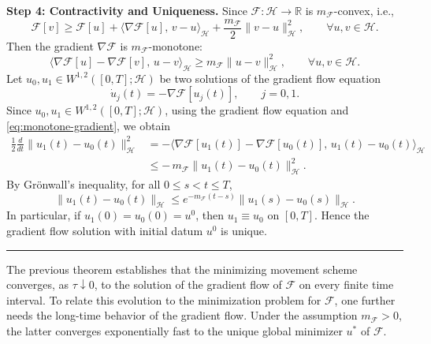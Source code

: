 \documentclass[twoside,11pt]{article}
\newcommand{\BlackBoxProof}{\rule{1.5ex}{1.5ex}}
\renewenvironment{proof}{\par\noindent{\bf Proof\ }}{\hfill\BlackBoxProof\par\medskip}
\newcommand{\calF}{\mathcal{F}}
\begin{document}
\begin{proof}
\noindent \textbf{Step 4: Contractivity and Uniqueness.} Since $\mathcal F:\mathcal H\to\mathbb R$ is $m_{\mathcal F}$-convex, i.e.,
\[
\mathcal F[v]\ge \mathcal F[u]
+\langle \nabla\mathcal F[u],\,v-u\rangle_{\mathcal H}
+\frac{m_{\mathcal F}}{2}\|v-u\|_{\mathcal H}^2,
\qquad \forall u,v\in\mathcal H.
\]
Then the gradient $\nabla\mathcal F$ is $m_{\mathcal F}$-monotone:
\begin{equation}\label{eq:monotone-gradient}
\langle \nabla\mathcal F[u]-\nabla\mathcal F[v],\,u-v\rangle_{\mathcal H}
\ge m_{\mathcal F}\|u-v\|_{\mathcal H}^2,
\qquad \forall u,v\in\mathcal H.
\end{equation}
Let $u_0,u_1\in W^{1,2}([0,T];\mathcal H)$ be two solutions of the gradient flow equation
\[
\dot u_j(t)=-\nabla\mathcal F[u_j(t)],
\qquad j=0,1.
\]
Since $u_0,u_1\in W^{1,2}([0,T];\mathcal H)$, using the gradient flow equation and \eqref{eq:monotone-gradient}, we obtain
\[
\begin{aligned}
\frac12\frac{d}{dt}\|u_1(t)-u_0(t)\|_{\mathcal H}^2
&=
-\langle \nabla\mathcal F[u_1(t)]-\nabla\mathcal F[u_0(t)],\,u_1(t)-u_0(t)\rangle_{\mathcal H} \\
&\le
-\,m_{\mathcal F}\|u_1(t)-u_0(t)\|_{\mathcal H}^2 .
\end{aligned}
\]
By Gr\"onwall's inequality, for all $0\le s<t\le T$,
\begin{equation*}
\|u_1(t)-u_0(t)\|_{\mathcal H}
\le e^{-m_{\mathcal F}(t-s)}\|u_1(s)-u_0(s)\|_{\mathcal H}.
\end{equation*}
In particular, if $u_1(0)=u_0(0)=u^0$, then $u_1\equiv u_0$ on $[0,T]$. Hence the gradient flow solution with initial datum $u^0$ is unique.
\end{proof}



The previous theorem establishes that the minimizing movement scheme converges, as $\tau\downarrow0$, to the solution of the gradient flow of $\calF$ on every finite time interval. To relate this evolution to the minimization problem for $\calF$, one further needs the long-time behavior of the gradient flow. Under the assumption $m_{\calF}>0$, the latter converges exponentially fast to the unique global minimizer $u^\ast$ of $\calF$. 
\end{document}
